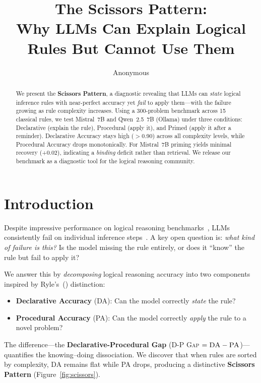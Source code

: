\documentclass{article}
\title{The Scissors Pattern: \\
Why LLMs Can Explain Logical Rules But Cannot Use Them}
\author{Anonymous}
\date{}
\newcommand{\dpgap}{\textsc{D-P Gap}}
\newcommand{\da}{\textsc{DA}}
\newcommand{\pa}{\textsc{PA}}
\begin{document}
\maketitle

\begin{abstract}
We present the \textbf{Scissors Pattern}, a diagnostic revealing
that LLMs can \emph{state} logical inference rules with near-perfect
accuracy yet \emph{fail} to apply them---with the failure growing as
rule complexity increases.
Using a 300-problem benchmark across 15 classical rules, we test
Mistral~7B and Qwen~2.5~7B (Ollama) under three conditions: Declarative (explain the
rule), Procedural (apply it), and Primed (apply it after a reminder).
Declarative Accuracy stays high ($>$0.90) across all complexity
levels, while Procedural Accuracy drops monotonically.
For Mistral~7B priming yields minimal recovery (+0.02), indicating a
\emph{binding} deficit rather than retrieval.
We release our benchmark as a diagnostic tool for the logical
reasoning community.
\end{abstract}

\section{Introduction}

Despite impressive performance on logical reasoning
benchmarks~\cite{saparov2023prontoqa,xu2024logicbench}, LLMs
consistently fail on individual inference
steps~\cite{hopp2024conditional}.
A key open question is: \emph{what kind of failure is this?}
Is the model missing the rule entirely, or does it ``know'' the rule
but fail to apply it?

We answer this by \emph{decomposing} logical reasoning accuracy into
two components inspired by Ryle's~(\citeyear{ryle1949}) distinction:
\begin{itemize}
    \item \textbf{Declarative Accuracy} (\da{}): Can the model
    correctly \emph{state} the rule?
    \item \textbf{Procedural Accuracy} (\pa{}): Can the model
    correctly \emph{apply} the rule to a novel problem?
\end{itemize}

The difference---the \textbf{Declarative-Procedural Gap}
(\dpgap{} $= \da - \pa$)---quantifies the knowing--doing
dissociation.
We discover that when rules are sorted by complexity, \da{} remains
flat while \pa{} drops, producing a distinctive \textbf{Scissors
Pattern} (Figure~\ref{fig:scissors}).
\end{document}
